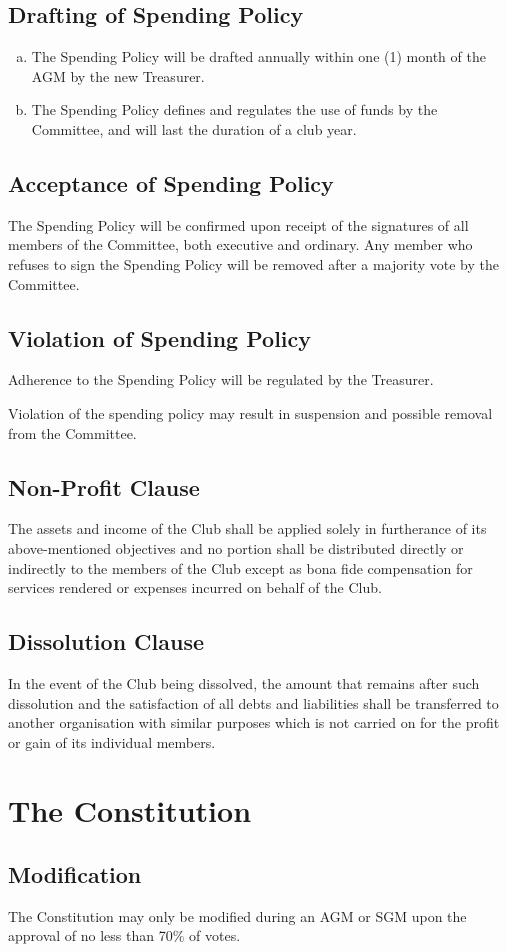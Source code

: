 \documentclass[a4paper,12pt]{article}
\begin{document}
\subsection{Drafting of Spending Policy}

\begin{enumerate}[a)]
	\item The Spending Policy will be drafted annually within one (1) month of the AGM by the new Treasurer.
	\item The Spending Policy defines and regulates the use of funds by the Committee, and will last the duration of a club year.
\end{enumerate}

\subsection{Acceptance of Spending Policy}

The Spending Policy will be confirmed upon receipt of the signatures of all members of the Committee, both executive and ordinary. Any member who refuses to sign the Spending Policy will be removed after a majority vote by the Committee.

\subsection{Violation of Spending Policy}

Adherence to the Spending Policy will be regulated by the Treasurer.

Violation of the spending policy may result in suspension and possible removal from the Committee.

\subsection{Non-Profit Clause}

The assets and income of the Club shall be applied solely in furtherance of its above-mentioned objectives and no portion shall be distributed directly or indirectly to the members of the Club except as bona fide compensation for services rendered or expenses incurred on behalf of the Club.

\subsection{Dissolution Clause}

In the event of the Club being dissolved, the amount that remains after such dissolution and the satisfaction of all debts and liabilities shall be transferred to another organisation with similar purposes which is not carried on for the profit or gain of its individual members.

\section{The Constitution}

\subsection{Modification}

The Constitution may only be modified during an AGM or SGM upon the approval of no less than 70\% of votes.
\end{document}
